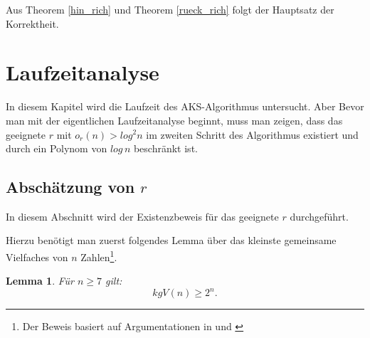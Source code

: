 \documentclass[12pt,oneside]{article}
\newtheorem{lemma}[theorem]{Lemma}
\theoremstyle{remark}
\theoremstyle{definition}
\begin{document}
Aus Theorem \ref{hin_rich} und Theorem \ref{rueck_rich} folgt der Hauptsatz der Korrektheit.
\newpage
\section{Laufzeitanalyse}

In diesem Kapitel wird die Laufzeit des AKS-Algorithmus untersucht. Aber Bevor man mit der eigentlichen Laufzeitanalyse beginnt, muss man zeigen, dass das geeignete $r$ mit $o_{r}(n) > log^2 n$ im zweiten Schritt des Algorithmus existiert und durch ein Polynom von $log \, n$ beschränkt ist.

\subsection{Abschätzung von $r$}
In diesem Abschnitt wird der Existenzbeweis für das geeignete $r$ durchgeführt.

Hierzu benötigt man zuerst folgendes Lemma über das kleinste gemeinsame Vielfaches von $n$ Zahlen\footnote{Der Beweis basiert auf Argumentationen in \cite{aks-aachen} und \cite{nair}}.

\begin{lemma}\label{lemma_1}
Für $n \geq 7$ gilt:\newline
\begin{equation}
    kgV(n) \geq 2^n.  
\end{equation}
\end{lemma}
\end{document}
